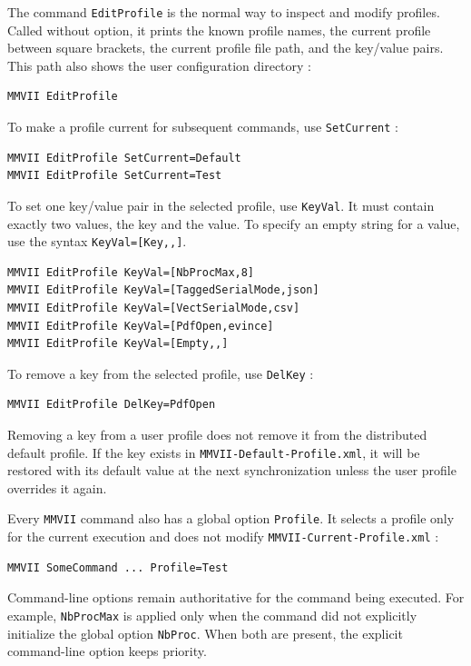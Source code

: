 The command {\tt EditProfile} is the normal way to inspect and modify profiles.
Called without option, it prints the known profile names, the current profile
between square brackets, the current profile file path, and the key/value pairs. This path also shows the user configuration directory :

\begin{verbatim}
MMVII EditProfile
\end{verbatim}

To make a profile current for subsequent commands, use {\tt SetCurrent} :

\begin{verbatim}
MMVII EditProfile SetCurrent=Default
MMVII EditProfile SetCurrent=Test
\end{verbatim}

To set one key/value pair in the selected profile, use {\tt KeyVal}. It must
contain exactly two values, the key and the value. To specify an empty string for
a value, use the syntax {\tt KeyVal=[Key,,]}.

\begin{verbatim}
MMVII EditProfile KeyVal=[NbProcMax,8]
MMVII EditProfile KeyVal=[TaggedSerialMode,json]
MMVII EditProfile KeyVal=[VectSerialMode,csv]
MMVII EditProfile KeyVal=[PdfOpen,evince]
MMVII EditProfile KeyVal=[Empty,,]
\end{verbatim}

To remove a key from the selected profile, use {\tt DelKey} :

\begin{verbatim}
MMVII EditProfile DelKey=PdfOpen
\end{verbatim}

Removing a key from a user profile does not remove it from the distributed
default profile. If the key exists in {\tt MMVII-Default-Profile.xml}, it will be
restored with its default value at the next synchronization unless the user
profile overrides it again.

Every {\tt MMVII} command also has a global option {\tt Profile}. It selects a
profile only for the current execution and does not modify
{\tt MMVII-Current-Profile.xml} :

\begin{verbatim}
MMVII SomeCommand ... Profile=Test
\end{verbatim}

Command-line options remain authoritative for the command being executed. For
example, {\tt NbProcMax} is applied only when the command did not explicitly
initialize the global option {\tt NbProc}. When both are present, the explicit
command-line option keeps priority.



